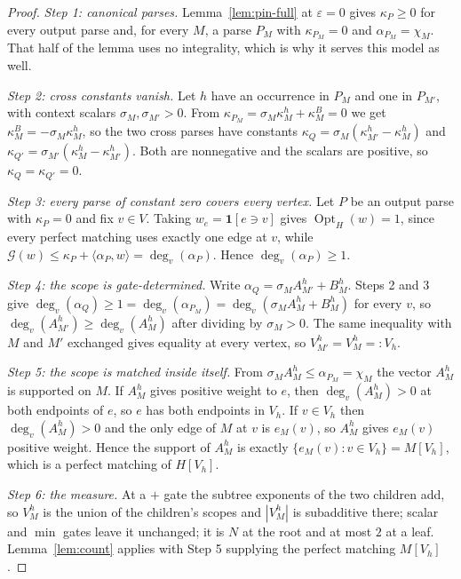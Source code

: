 \documentclass[11pt]{article}
\newcommand{\Opt}{\operatorname{Opt}}
\begin{document}
\begin{proof}
\emph{Step 1: canonical parses.}
Lemma~\ref{lem:pin-full} at $\varepsilon=0$ gives $\kappa_P\ge0$ for every output
parse and, for every $M$, a parse $P_M$ with $\kappa_{P_M}=0$ and
$\alpha_{P_M}=\chi_M$.  That half of the lemma uses no integrality, which is why
it serves this model as well.

\emph{Step 2: cross constants vanish.}
Let $h$ have an occurrence in $P_M$ and one in $P_{M'}$, with context scalars
$\sigma_M,\sigma_{M'}>0$.  From
$\kappa_{P_M}=\sigma_M\kappa^h_M+\kappa^{B}_M=0$ we get
$\kappa^{B}_M=-\sigma_M\kappa^h_M$, so the two cross parses have constants
$\kappa_Q=\sigma_M(\kappa^h_{M'}-\kappa^h_M)$ and
$\kappa_{Q'}=\sigma_{M'}(\kappa^h_M-\kappa^h_{M'})$.  Both are nonnegative and
the scalars are positive, so $\kappa_Q=\kappa_{Q'}=0$.

\emph{Step 3: every parse of constant zero covers every vertex.}
Let $P$ be an output parse with $\kappa_P=0$ and fix $v\in V$.  Taking
$w_e=\mathbf1[e\ni v]$ gives $\Opt_H(w)=1$, since every perfect matching uses
exactly one edge at $v$, while
$\mathcal G(w)\le\kappa_P+\langle\alpha_P,w\rangle=\deg_v(\alpha_P)$.  Hence
$\deg_v(\alpha_P)\ge1$.

\emph{Step 4: the scope is gate-determined.}
Write $\alpha_Q=\sigma_MA^h_{M'}+B^h_M$.  Steps 2 and 3 give
$\deg_v(\alpha_Q)\ge1=\deg_v(\alpha_{P_M})=\deg_v(\sigma_MA^h_M+B^h_M)$ for every
$v$, so $\deg_v(A^h_{M'})\ge\deg_v(A^h_M)$ after dividing by $\sigma_M>0$.  The
same inequality with $M$ and $M'$ exchanged gives equality at every vertex, so
$V^h_{M'}=V^h_M=:V_h$.

\emph{Step 5: the scope is matched inside itself.}
From $\sigma_MA^h_M\le\alpha_{P_M}=\chi_M$ the vector $A^h_M$ is supported on
$M$.  If $A^h_M$ gives positive weight to $e$, then $\deg_v(A^h_M)>0$ at both
endpoints of $e$, so $e$ has both endpoints in $V_h$.  If $v\in V_h$ then
$\deg_v(A^h_M)>0$ and the only edge of $M$ at $v$ is $e_M(v)$, so $A^h_M$ gives
$e_M(v)$ positive weight.  Hence the support of $A^h_M$ is exactly
$\{e_M(v):v\in V_h\}=M[V_h]$, which is a perfect matching of $H[V_h]$.

\emph{Step 6: the measure.}
At a $+$ gate the subtree exponents of the two children add, so $V^h_M$ is the
union of the children's scopes and $|V^h_M|$ is subadditive there; scalar and
$\min$ gates leave it unchanged; it is $N$ at the root and at most $2$ at a
leaf.  Lemma~\ref{lem:count} applies with Step 5 supplying the perfect matching
$M[V_h]$.
\end{proof}
\end{document}
